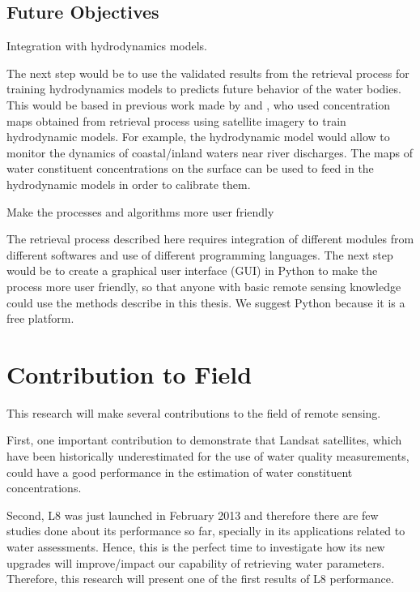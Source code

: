 \subsection{Future Objectives}
	\begin{enumerate}
			{\bf \item Integration with hydrodynamics models.  } 

The next step would be to use the validated results from the retrieval process for training hydrodynamics models to predicts future behavior of the water bodies. This would be based in previous work made by \cite{Pahlevan:2012} and \cite{GeraceThesis}, who used concentration maps obtained from retrieval process using satellite imagery to train hydrodynamic models. For example, the hydrodynamic model would allow to monitor the dynamics of coastal/inland waters near river discharges. The maps of water constituent concentrations on the surface can be used to feed in the hydrodynamic models in order to calibrate them. 

			{\bf \item Make the processes and algorithms more user friendly} 

The retrieval process described here requires integration of different modules from different softwares and use of different programming languages. The next step would be to create a graphical user interface (GUI) in Python to make the process more user friendly, so that anyone with basic remote sensing knowledge could use the methods describe in this thesis. We suggest Python because it is a free platform.

	\end{enumerate}	

		

\section{Contribution to Field}
\label{sec:contributiontofield}
This research will make several contributions to the field of remote sensing.

First, one important contribution to demonstrate that Landsat satellites, which have been historically underestimated for the use of water quality measurements, could have a good performance in the estimation of water constituent concentrations.

Second, L8 was just launched in February 2013 and therefore there are few studies done about its performance so far, specially in its applications related to water assessments. Hence, this is the perfect time to investigate how its new upgrades will improve/impact our capability of retrieving water parameters. Therefore, this research will present one of the first results of L8 performance.  

